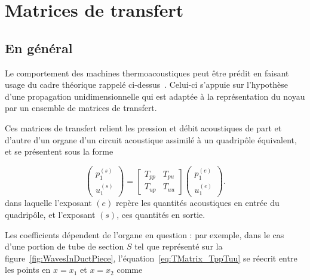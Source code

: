 \section{Matrices de transfert}
\subsection{En général}
Le comportement des machines thermoacoustiques peut être prédit en faisant usage du cadre théorique rappelé ci-dessus~\cite{rott_damped_1969, rott_thermoacoustics_1980, swift_thermoacoustics_2017}. Celui-ci s'appuie sur l'hypothèse d'une propagation unidimensionnelle qui est adaptée à la représentation du noyau par un ensemble de matrices de transfert.

Ces matrices de transfert relient les pression et débit acoustiques de part et d'autre d'un organe d'un circuit acoustique assimilé à un quadripôle équivalent, et se présentent sous la forme

\begin{equation}
    \begin{pmatrix}
        p_1^{(s)}\\
        u_1^{(s)}
    \end{pmatrix}=\begin{bmatrix}
        T_{pp} & T_{pu} \\
        T_{up} & T_{uu}
    \end{bmatrix}\begin{pmatrix}
        p_1^{(e)}\\
        u_1^{(e)}
    \end{pmatrix}.
    \label{eq:TMatrix_TppTuu}
\end{equation}
dans laquelle l'exposant $(e)$ repère les quantités acoustiques en entrée du quadripôle, et l'exposant $(s)$, ces quantités en sortie.\smallskip

Les coefficients dépendent de l'organe en question : par exemple, dans le cas d'une portion de tube de section $S$ tel que représenté sur la figure~\ref{fig:WavesInDuctPiece}, l'équation~\eqref{eq:TMatrix_TppTuu} se réecrit entre les points en $x=x_1$ et $x=x_2$ comme


